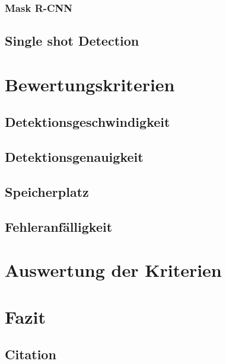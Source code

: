 \documentclass[12pt,
titlepage,
a4paper,
oneside,     %
openany,     %
listof=totoc,  %
numbers = noenddot, %
bibliography=totoc,    %
headsepline, %
]{scrbook} %
\begin{document}
\subsection{Mask R-CNN}
\label{subsec_mrcnn}

\section{Single shot Detection}
\label{sec_ssd}



\chapter{Bewertungskriterien}
\label{cha:bewertungskriterien} 



\section{Detektionsgeschwindigkeit}
\label{sec_detgeschw}

\section{Detektionsgenauigkeit}
\label{sec_detgenau}

\section{Speicherplatz}
\label{sec_speicher}

\section{Fehleranfälligkeit}
\label{sec_fehler}


\chapter{Auswertung der Kriterien}
\label{cha:auswertung}



\chapter{Fazit}
\label{cha:fazit}



\section{Citation}
\label{sec_citation}
\end{document}
